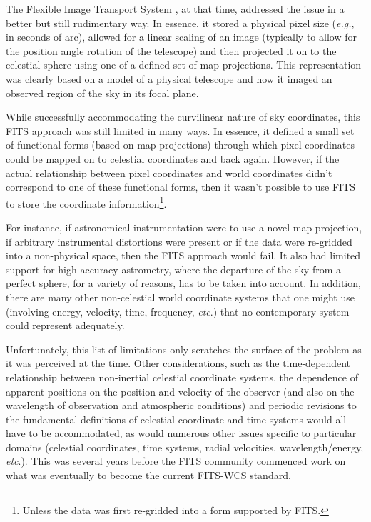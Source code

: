 \documentclass[final,authoryear,5p,times,twocolumn]{elsarticle}
\begin{document}
The Flexible Image Transport System
\citep[FITS;][]{1981A&AS...44..363W,1995ASPC...77..233G}, at that
time, addressed the issue in a better but still rudimentary way. In
essence, it stored a physical pixel size (\emph{e.g.}, in seconds of arc),
allowed for a linear scaling of an image (typically to allow for the
position angle rotation of the telescope) and then projected it on to
the celestial sphere using one of a defined set of map
projections. This representation was clearly based on a model of a
physical telescope and how it imaged an observed region of the sky in
its focal plane.

While successfully accommodating the curvilinear nature of sky
coordinates, this FITS approach was still limited in many ways. In
essence, it defined a small set of functional forms (based on map
projections) through which pixel coordinates could be mapped on to
celestial coordinates and back again. However, if the actual
relationship between pixel coordinates and world coordinates didn't
correspond to one of these functional forms, then it wasn't possible
to use FITS to store the coordinate information\footnote{Unless the data was
first re-gridded into a form supported by FITS.}.

For instance, if astronomical instrumentation were to use a novel map
projection, if arbitrary instrumental distortions were present or if
the data were re-gridded into a non-physical space, then the FITS
approach would fail. It also had limited support for high-accuracy
astrometry, where the departure of the sky from a perfect sphere, for
a variety of reasons, has to be taken into account. In addition, there
are many other non-celestial world coordinate systems that one might
use (involving energy, velocity, time, frequency, \emph{etc}.) that no
contemporary system could represent adequately.

Unfortunately, this list of limitations only scratches the surface of
the problem as it was perceived at the time. Other considerations,
such as the time-dependent relationship between non-inertial celestial
coordinate systems, the dependence of apparent positions on the
position and velocity of the observer (and also on the wavelength of
observation and atmospheric conditions) and periodic revisions to the
fundamental definitions of celestial coordinate and time systems would
all have to be accommodated, as would numerous other issues specific
to particular domains (celestial coordinates, time systems, radial
velocities, wavelength/energy, \emph{etc}.). This was several years before the
FITS community commenced work on what was eventually to become the current
FITS-WCS standard.
\end{document}
